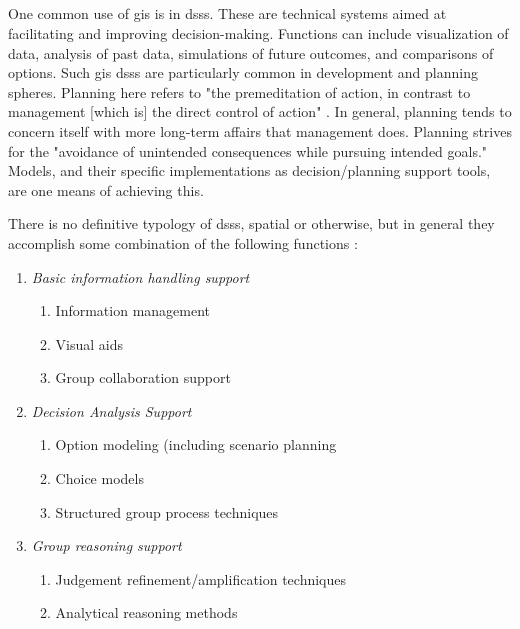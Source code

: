 \subsection{}


One common use of \ac{gis} is in \acp{dss}. These are technical systems aimed at facilitating and improving decision-making. Functions can include visualization of data, analysis of past data, simulations of future outcomes, and comparisons of options. Such \ac{gis} \acp{dss} are particularly common in development and planning spheres. Planning here refers to "the premeditation of action, in contrast to management [which is] the direct control of action" \cite{harrisLocationalModelsGeographic1993}. In general, planning tends to concern itself with more long-term affairs that management does. Planning strives for the "avoidance of unintended consequences while pursuing intended goals." Models, and their specific implementations as decision/planning support tools, are one means of achieving this. 

There is no definitive typology of \acp{dss}, spatial or otherwise, but in general they accomplish some combination of the following functions \cite{jankowskiGISGroupDecision2001}: 

\begin{enumerate}[itemsep=0pt,parsep=0pt]
	\item{\textit{Basic information handling support}}
		\begin{enumerate}[itemsep=0pt,parsep=0pt,topsep=0pt, partopsep=0pt]
			\item{Information management}
			\item{Visual aids}
			\item{Group collaboration support}
		\end{enumerate}
	\item{\textit{Decision Analysis Support}}
		\begin{enumerate}[itemsep=0pt,parsep=0pt,topsep=0pt, partopsep=0pt]
			\item{Option modeling (including scenario planning \cite{borjesonScenarioTypesTechniques2006}}
			\item{Choice models}
			\item{Structured group process techniques}
		\end{enumerate}
	\item{\textit{Group reasoning support}}
		\begin{enumerate}[itemsep=0pt,parsep=0pt,topsep=0pt, partopsep=0pt]
			\item{Judgement refinement/amplification techniques}
			\item{Analytical reasoning methods}
		\end{enumerate}
\end{enumerate}


